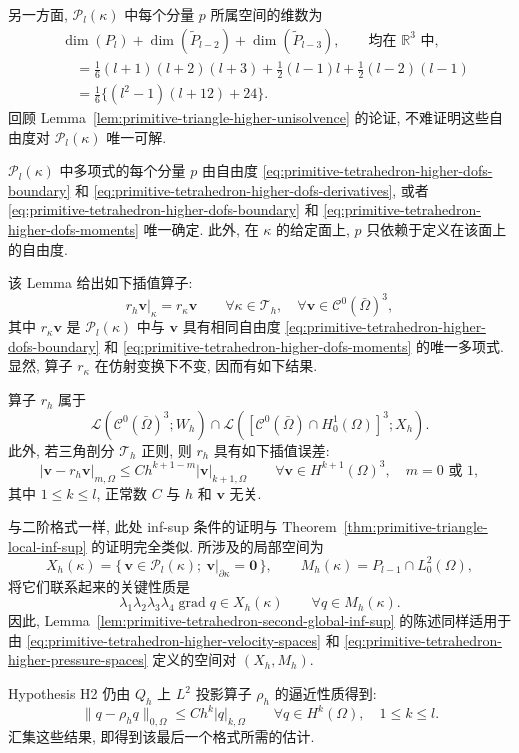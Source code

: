 另一方面, $\mathcal P_l(\kappa)$ 中每个分量 $p$ 所属空间的维数为
\[
\begin{aligned}
&\dim(P_l)+\dim(\widetilde P_{l-2})+\dim(\widetilde P_{l-3}),
\qquad\text{均在 }\mathbb R^3\text{ 中},\\
&\quad=\frac16(l+1)(l+2)(l+3)
+\frac12(l-1)l+\frac12(l-2)(l-1)\\
&\quad=\frac16\{(l^2-1)(l+12)+24\}.
\end{aligned}
\]
回顾 Lemma~\ref{lem:primitive-triangle-higher-unisolvence} 的论证,
不难证明这些自由度对 $\mathcal P_l(\kappa)$ 唯一可解.

\setcounter{statement}{11}
\begin{Lemma}\label{lem:primitive-tetrahedron-higher-unisolvence}
$\mathcal P_l(\kappa)$ 中多项式的每个分量 $p$ 由自由度
\eqref{eq:primitive-tetrahedron-higher-dofs-boundary} 和
\eqref{eq:primitive-tetrahedron-higher-dofs-derivatives}, 或者
\eqref{eq:primitive-tetrahedron-higher-dofs-boundary} 和
\eqref{eq:primitive-tetrahedron-higher-dofs-moments} 唯一确定.
此外, 在 $\kappa$ 的给定面上, $p$ 只依赖于定义在该面上的自由度.
\end{Lemma}

该 Lemma 给出如下插值算子:
\[
r_h\mathbf v|_\kappa=r_\kappa\mathbf v
\qquad\forall\kappa\in\mathcal T_h,
\quad\forall\mathbf v\in\mathcal C^0(\bar\Omega)^3,
\]
其中 $r_\kappa\mathbf v$ 是 $\mathcal P_l(\kappa)$ 中与 $\mathbf v$
具有相同自由度
\eqref{eq:primitive-tetrahedron-higher-dofs-boundary} 和
\eqref{eq:primitive-tetrahedron-higher-dofs-moments} 的唯一多项式.
显然, 算子 $r_\kappa$ 在仿射变换下不变, 因而有如下结果.

\setcounter{statement}{12}
\begin{Lemma}\label{lem:primitive-tetrahedron-higher-interpolation}
算子 $r_h$ 属于
\[
\mathcal L(\mathcal C^0(\bar\Omega)^3;W_h)
\cap\mathcal L([\mathcal C^0(\bar\Omega)\cap H_0^1(\Omega)]^3;X_h).
\]
此外, 若三角剖分 $\mathcal T_h$ 正则, 则 $r_h$ 具有如下插值误差:
\begin{equation}\label{eq:primitive-tetrahedron-higher-interpolation}
|\mathbf v-r_h\mathbf v|_{m,\Omega}
\leq Ch^{k+1-m}|\mathbf v|_{k+1,\Omega}
\qquad\forall\mathbf v\in H^{k+1}(\Omega)^3,
\quad m=0\text{ 或 }1,
\end{equation}
其中 $1\leq k\leq l$, 正常数 $C$ 与 $h$ 和 $\mathbf v$ 无关.
\end{Lemma}

与二阶格式一样, 此处 inf-sup 条件的证明与
Theorem~\ref{thm:primitive-triangle-local-inf-sup} 的证明完全类似.
所涉及的局部空间为
\[
X_h(\kappa)=\{\,\mathbf v\in\mathcal P_l(\kappa);
\ \mathbf v|_{\partial\kappa}=\mathbf0\,\},
\qquad
M_h(\kappa)=P_{l-1}\cap L_0^2(\Omega),
\]
将它们联系起来的关键性质是
\[
\lambda_1\lambda_2\lambda_3\lambda_4\operatorname{grad}q
\in X_h(\kappa)
\qquad\forall q\in M_h(\kappa).
\]
因此, Lemma~\ref{lem:primitive-tetrahedron-second-global-inf-sup}
的陈述同样适用于由
\eqref{eq:primitive-tetrahedron-higher-velocity-spaces} 和
\eqref{eq:primitive-tetrahedron-higher-pressure-spaces} 定义的空间对
$(X_h,M_h)$.

Hypothesis H2 仍由 $Q_h$ 上 $L^2$ 投影算子 $\rho_h$ 的逼近性质得到:
\[
\|q-\rho_hq\|_{0,\Omega}
\leq Ch^k|q|_{k,\Omega}
\qquad\forall q\in H^k(\Omega),
\quad1\leq k\leq l.
\]
汇集这些结果, 即得到该最后一个格式所需的估计.
